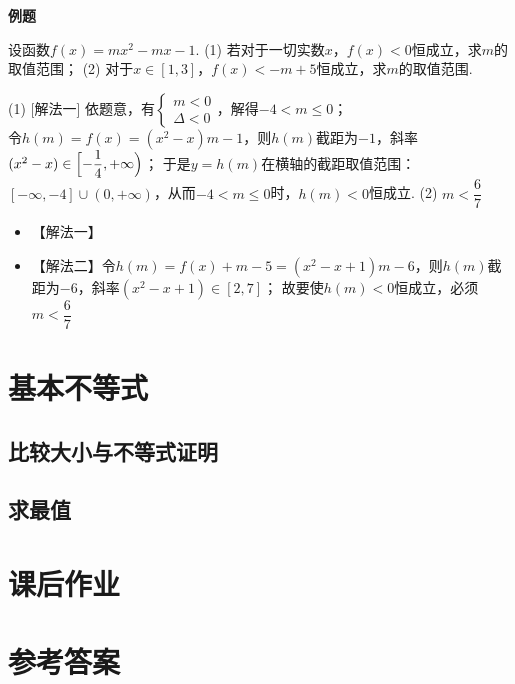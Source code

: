   \begin{exercise}{\textbf{例题}}
    \item 设函数$f(x)=mx^2-mx-1$.
          (1) 若对于一切实数$x$，$f(x)<0$恒成立，求$m$的取值范围；
          (2) 对于$x\in[1,3]$，$f(x)<-m+5$恒成立，求$m$的取值范围.
          \begin{answer}
            (1) [解法一] 依题意，有$\begin{cases}m<0\\ \Delta<0\end{cases}$，解得$-4<m\leqslant 0$；\\
                [解法二] 令$h(m)=f(x)=(x^2-x)m-1$，则$h(m)$截距为$-1$，斜率$(x^2-x)\in\Bigl[-\dfrac14,+\infty\Bigr)$；
                         于是$y=h(m)$在横轴的截距取值范围：$[-\infty,-4]\cup(0,+\infty)$，从而$-4<m\leqslant 0$时，$h(m)<0$恒成立.
            (2) $m<\dfrac67$
                \begin{itemize}
                  \item 【解法一】 
                  \item 【解法二】令$h(m)=f(x)+m-5=(x^2-x+1)m-6$，则$h(m)$截距为$-6$，斜率$(x^2-x+1)\in[2,7]$；
                        故要使$h(m)<0$恒成立，必须$m<\dfrac67$
                \end{itemize}
          \end{answer}
  \end{exercise}


\section{基本不等式}
  \subsection{比较大小与不等式证明}
  \subsection{求最值}




\newpage
\section{课后作业}
  \begin{exercise}

  \end{exercise}
\stopexercise

\newpage
\section{参考答案}
\begin{multicols}{2}
  \printanswer
\end{multicols}
